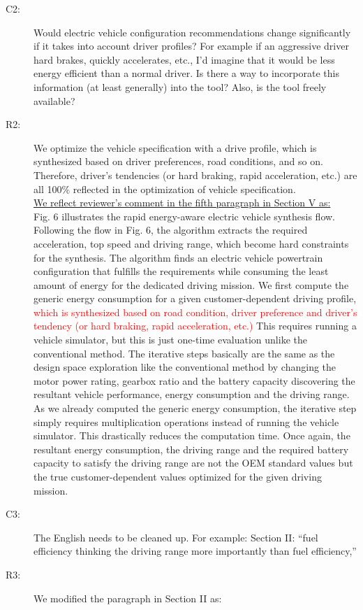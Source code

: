 \documentclass[onecolumn]{IEEEconf}
\begin{document}
\begin{description}
\item [C2: ] Would electric vehicle configuration recommendations change significantly if it takes into account driver profiles? For example if an aggressive driver hard brakes, quickly accelerates, etc., I'd imagine that it would be less energy efficient than a normal driver. Is there a way to incorporate this information (at least generally) into the tool? Also, is the tool freely available?
\item [R2: ] We optimize the vehicle specification with a drive profile, which is synthesized based on driver preferences, road conditions, and so on. Therefore, driver's tendencies (or hard braking, rapid acceleration, etc.) are all 100\% reflected in the optimization of vehicle specification.\\

\underline{We reflect reviewer’s comment in the fifth paragraph in Section V as:}\\
Fig. 6 illustrates the rapid energy-aware electric vehicle synthesis flow. 
Following the flow in Fig. 6, the algorithm extracts the required acceleration, top speed and driving range, which become hard constraints for the synthesis. The algorithm finds an electric vehicle powertrain configuration that fulfills the requirements while consuming the least amount of energy for the dedicated driving mission. 
We first compute the generic energy consumption for a given customer-dependent driving profile, \textcolor{red}{which is synthesized based on road condition, driver preference and driver's tendency (or hard braking, rapid acceleration, etc.)} This requires running a vehicle simulator, but this is just one-time evaluation unlike the conventional method. The iterative steps basically are the same as the design space exploration like the conventional method by changing the motor power rating, gearbox ratio and the battery capacity discovering the resultant vehicle performance, energy consumption and the driving range. As we already computed the generic energy consumption, the iterative step simply requires multiplication operations instead of running the vehicle simulator. This drastically reduces the computation time. Once again, the resultant energy consumption, the driving range and the required battery capacity to satisfy the driving range are not the OEM standard values but the true customer-dependent values optimized for the given driving mission. 
~\\

\item [C3: ]  The English needs to be cleaned up. For example: Section II: “fuel efficiency thinking the driving range more importantly than fuel efficiency,”
\item [R3: ] We modified the paragraph in Section II as:\\


\end{description}
\end{document}
